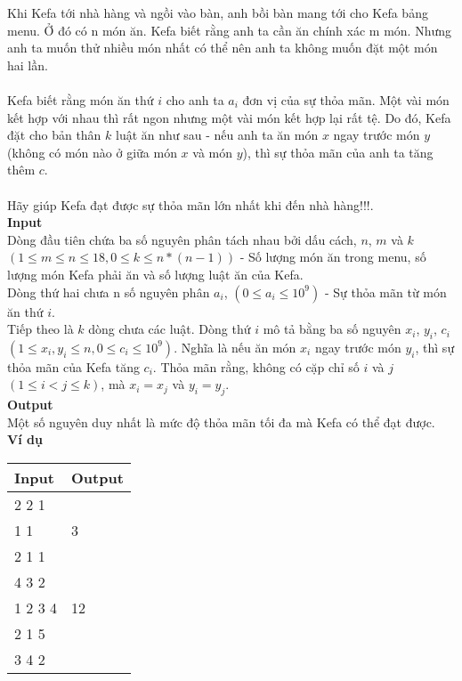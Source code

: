 Khi Kefa tới nhà hàng và ngồi vào bàn, anh bồi bàn mang tới cho Kefa bảng menu. Ở đó có n món ăn. Kefa biết rằng anh ta cần ăn chính xác m món. Nhưng anh ta muốn thử nhiều món nhất có thể nên anh ta không muốn đặt một món hai lần.  
\\
\\
Kefa biết rằng món ăn thứ $i$ cho anh ta $a_{i}$ đơn vị của sự thỏa mãn. Một vài món kết hợp với nhau thì rất ngon nhưng một vài món kết hợp lại rất tệ. Do đó, Kefa đặt cho bản thân $k$ luật ăn như sau - nếu anh ta ăn món $x$ ngay trước món $y$ (không có món nào ở giữa món $x$ và món $y$), thì sự thỏa mãn của anh ta tăng thêm $c$.
\\
\\
Hãy giúp Kefa đạt được sự thỏa mãn lớn nhất khi đến nhà hàng!!!.
\\

\textbf{Input}
\\
Dòng đầu tiên chứa ba số nguyên phân tách nhau bởi dấu cách, $n$, $m$ và $k$ $(1 \leq m \leq n \leq 18, 0 \leq k \leq n*(n - 1))$ - Số lượng món ăn trong menu, số lượng món Kefa phải ăn và số lượng luật ăn của Kefa. 
\\

Dòng thứ hai chưa n số nguyên phân $a_{i}$, $(0 \leq a_{i} \leq 10^{9})$ - Sự thỏa mãn từ món ăn thứ $i$.
\\

Tiếp theo là $k$ dòng chưa các luật. Dòng thứ $i$ mô tả bằng ba số nguyên $x_{i}$, $y_{i}$, $c_{i}$ $(1 \leq x_{i}, y_{i} \leq n, 0 \leq c_{i} \leq 10^{9})$. Nghĩa là nếu ăn món $x_{i}$ ngay trước món $y_{i}$, thì sự thỏa mãn của Kefa tăng $c_{i}$. Thỏa mãn rằng, không có cặp chỉ số $i$ và $j$ $(1 \leq i < j \leq k)$, mà $x_{i} = x_{j}$ và $y_{i} = y_{j}$.
\\

\textbf{Output}
\\ 
Một số nguyên duy nhất là mức độ thỏa mãn tối đa mà Kefa có thể đạt được. 
\\

\textbf{Ví dụ}
\begin{table}[h!]
    \begin{center}
        \begin{tabular}{|p{7cm}|p{5cm}|}
            \hline
            \textbf{Input} & \textbf{Output} \\ 
            \hline
            2 2 1 & \\
            1 1 & 3 \\
            2 1 1 & \\
            \hline
            4 3 2 & \\ 
            1 2 3 4 & 12 \\ 
            2 1 5 & \\ 
            3 4 2 & \\
            \hline
        \end{tabular}
    \end{center}
\end{table}

